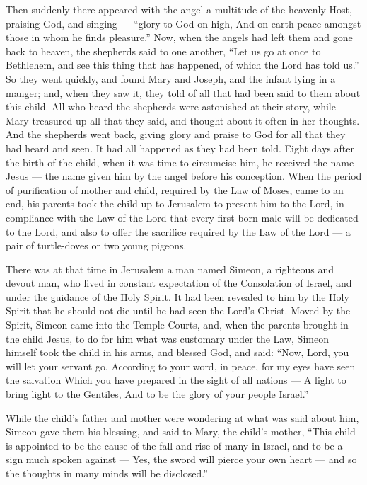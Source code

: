  Then suddenly there appeared with the angel a multitude of
the heavenly Host, praising God, and singing ---  ``glory
to God on high, And on earth peace amongst those in whom he finds
pleasure.''  Now, when the angels had left them and gone
back to heaven, the shepherds said to one another, ``Let us go at once
to Bethlehem, and see this thing that has happened, of which the Lord
has told us.''  So they went quickly, and found Mary and
Joseph, and the infant lying in a manger;  and, when they
saw it, they told of all that had been said to them about this child.
 All who heard the shepherds were astonished at their
story,  while Mary treasured up all that they said, and
thought about it often in her thoughts.  And the shepherds
went back, giving glory and praise to God for all that they had heard
and seen. It had all happened as they had been told.  Eight
days after the birth of the child, when it was time to circumcise him,
he received the name Jesus --- the name given him by the angel before
his conception.  When the period of purification of mother
and child, required by the Law of Moses, came to an end, his parents
took the child up to Jerusalem to present him to the Lord, 
in compliance with the Law of the Lord that every first-born male will
be dedicated to the Lord,  and also to offer the sacrifice
required by the Law of the Lord --- a pair of turtle-doves or two young
pigeons.

 There was at that time in Jerusalem a man named Simeon, a
righteous and devout man, who lived in constant expectation of the
Consolation of Israel, and under the guidance of the Holy Spirit.
 It had been revealed to him by the Holy Spirit that he
should not die until he had seen the Lord's Christ.  Moved
by the Spirit, Simeon came into the Temple Courts, and, when the parents
brought in the child Jesus, to do for him what was customary under the
Law,  Simeon himself took the child in his arms, and
blessed God, and said:  ``Now, Lord, you will let your
servant go, According to your word, in peace,  for my eyes
have seen the salvation  Which you have prepared in the
sight of all nations ---  A light to bring light to the
Gentiles, And to be the glory of your people Israel.''

 While the child's father and mother were wondering at what
was said about him,  Simeon gave them his blessing, and
said to Mary, the child's mother, ``This child is appointed to be the
cause of the fall and rise of many in Israel, and to be a sign much
spoken against ---  Yes, the sword will pierce your own
heart --- and so the thoughts in many minds will be disclosed.''

